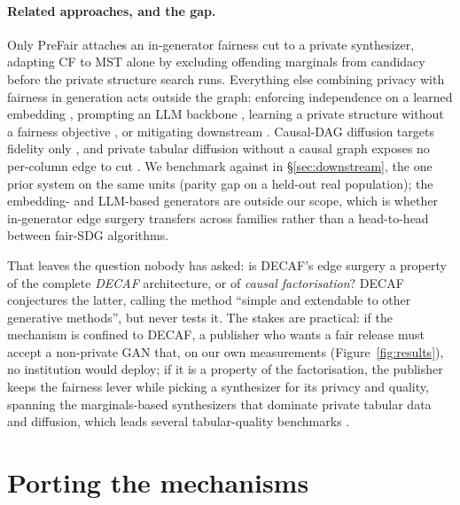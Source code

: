 \documentclass[manuscript,screen,review]{acmart}
\begin{document}
\paragraph{Related approaches, and the gap.}
Only PreFair \citep{pujol2023prefair} attaches an in-generator fairness cut to
a private synthesizer, adapting CF to MST alone by excluding offending
marginals from candidacy before the private structure search runs. Everything
else combining privacy with fairness in generation acts outside the graph:
enforcing independence on a learned embedding
\citep{hyrup2025flip,sarmin2025pfwgan}, prompting an LLM backbone
\citep{nagesh2025faircausesyn}, learning a private structure without a
fairness objective \citep{jia2025pradagan}, or mitigating downstream
\citep{angelozzi2026where}. Causal-DAG diffusion targets fidelity only
\citep{zhang2025causaldifftab,jacob2026tabscm}, and private tabular diffusion
without a causal graph exposes no per-column edge to cut
\citep{zhu2024dptldm}. We benchmark against \citet{angelozzi2026where} in
\S\ref{sec:downstream}, the one prior system on the same units (parity gap on
a held-out real population); the embedding- and LLM-based generators are
outside our scope, which is whether in-generator edge surgery transfers across
families rather than a head-to-head between fair-SDG algorithms.

That leaves the question nobody has asked: is DECAF's edge surgery a property
of the complete \emph{DECAF} architecture, or of \emph{causal factorisation}?
DECAF conjectures the latter, calling the method ``simple and extendable to
other generative methods'', but never tests it. The stakes are practical: if
the mechanism is confined to DECAF, a publisher who wants a fair release must
accept a non-private GAN that, on our own measurements
(Figure~\ref{fig:results}), no institution would deploy; if it is a property
of the factorisation, the publisher keeps the fairness lever while picking a
synthesizer for its privacy and quality, spanning the marginals-based
synthesizers that dominate private tabular data
\citep{mckenna2021mst,zhang2014privbayes,zhang2021privsyn} and diffusion,
which leads several tabular-quality benchmarks \citep{kotelnikov2023tabddpm}.

\section{Porting the mechanisms}
\label{sec:method}
\end{document}

